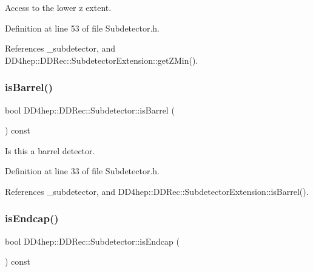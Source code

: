 Access to the lower z extent. 



Definition at line 53 of file Subdetector.\+h.



References \+\_\+subdetector, and D\+D4hep\+::\+D\+D\+Rec\+::\+Subdetector\+Extension\+::get\+Z\+Min().

\hypertarget{class_d_d4hep_1_1_d_d_rec_1_1_subdetector_a25c6a34b2548340115138840790b9d57}{}\label{class_d_d4hep_1_1_d_d_rec_1_1_subdetector_a25c6a34b2548340115138840790b9d57} 
\subsubsection{\texorpdfstring{is\+Barrel()}{isBarrel()}}
{\footnotesize\ttfamily bool D\+D4hep\+::\+D\+D\+Rec\+::\+Subdetector\+::is\+Barrel (\begin{DoxyParamCaption}{ }\end{DoxyParamCaption}) const\hspace{0.3cm}{\ttfamily [inline]}}



Is this a barrel detector. 



Definition at line 33 of file Subdetector.\+h.



References \+\_\+subdetector, and D\+D4hep\+::\+D\+D\+Rec\+::\+Subdetector\+Extension\+::is\+Barrel().

\hypertarget{class_d_d4hep_1_1_d_d_rec_1_1_subdetector_a299bd4777e3110838df51be7c0809b35}{}\label{class_d_d4hep_1_1_d_d_rec_1_1_subdetector_a299bd4777e3110838df51be7c0809b35} 
\subsubsection{\texorpdfstring{is\+Endcap()}{isEndcap()}}
{\footnotesize\ttfamily bool D\+D4hep\+::\+D\+D\+Rec\+::\+Subdetector\+::is\+Endcap (\begin{DoxyParamCaption}{ }\end{DoxyParamCaption}) const\hspace{0.3cm}{\ttfamily [inline]}}



